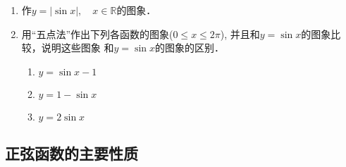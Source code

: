 \begin{ex}
    \begin{enumerate}
        \item 作$y=|\sin x|,\quad x\in\mathbb{R}$的图象．
        \item 用“五点法”作出下列各函数的图象($0\le x\le 2\pi$), 并且和$y=\sin x$的图象比较，说明这些图象 和$y=\sin x$的图象的区别．
        \begin{enumerate}
            \item $y=\sin x-1$
            \item $y=1-\sin x$
          \item $y=2\sin x$
        \end{enumerate}
    \end{enumerate}
\end{ex}

\subsection{正弦函数的主要性质}

